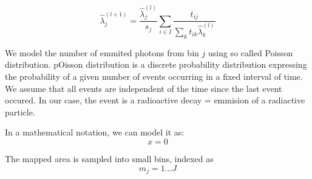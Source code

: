 \begin{equation}
\hat{\lambda}_{j}^{(l+1)} = \frac{\hat{\lambda}_{j}^{(l)}}{s_{j}} \sum_{i \in I} \frac{t_{ij}}{\sum_{k} t_{ik} \hat{\lambda}_{k}^{(l)}}
\end{equation}




We model the number of emmited photons from bin $j$ using so called Poisson distribution.
pOisson distribution is a discrete probability distribution expressing the probability of a given number of events occurring in a fixed interval of time.
We assume that all events are independent of the time since the last event occured.
In our case, the event is a radioactive decay = emmision of a radiactive particle.

In a mathematical notation, we can model it as:
\begin{equation}
  x = 0
\end{equation}


The mapped area is sampled into small bins, indexed as 
\begin{equation}
  m_{j} = 1 ... J
\end{equation}

